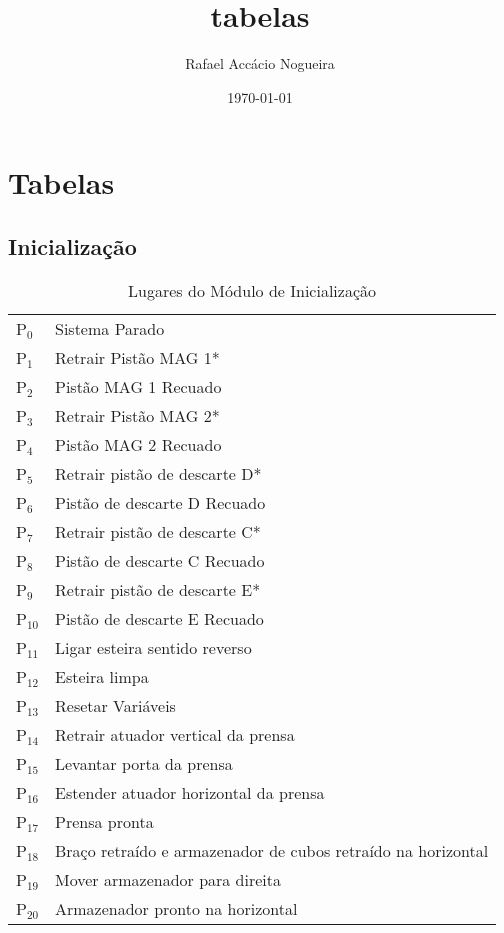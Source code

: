 \documentclass[11pt]{article}
\author{Rafael Accácio Nogueira}
\date{\today}
\title{tabelas}
\begin{document}
\maketitle
\tableofcontents

\section{Tabelas}
\label{sec-1}
\subsection{Inicialização}
\label{sec-1-1}
\begin{table}[htb]
\caption{Lugares do Módulo de Inicialização}
\centering
\begin{tabular}{ll}
P$_{\text{0}}$ & Sistema Parado\\
P$_{\text{1}}$ & Retrair Pistão MAG 1*\\
P$_{\text{2}}$ & Pistão MAG 1 Recuado\\
P$_{\text{3}}$ & Retrair Pistão MAG 2*\\
P$_{\text{4}}$ & Pistão MAG 2 Recuado\\
P$_{\text{5}}$ & Retrair pistão de descarte D*\\
P$_{\text{6}}$ & Pistão de descarte D Recuado\\
P$_{\text{7}}$ & Retrair pistão de descarte C*\\
P$_{\text{8}}$ & Pistão de descarte C Recuado\\
P$_{\text{9}}$ & Retrair pistão de descarte E*\\
P$_{\text{10}}$ & Pistão de descarte E Recuado\\
P$_{\text{11}}$ & Ligar esteira sentido reverso\\
P$_{\text{12}}$ & Esteira limpa\\
P$_{\text{13}}$ & Resetar Variáveis\footnotemark\\
P$_{\text{14}}$ & Retrair atuador vertical da prensa\\
P$_{\text{15}}$ & Levantar porta da prensa\\
P$_{\text{16}}$ & Estender atuador horizontal da prensa\\
P$_{\text{17}}$ & Prensa pronta\\
P$_{\text{18}}$ & Braço retraído e armazenador de cubos retraído na horizontal\\
P$_{\text{19}}$ & Mover armazenador para direita\\
P$_{\text{20}}$ & Armazenador pronto na horizontal\\

\end{tabular}
\end{table}
\end{document}
